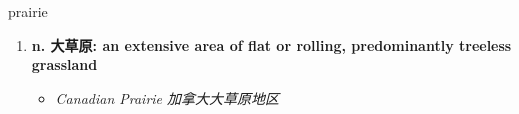 
\begin{frame}
{\huge prairie}
\begin{center}
\begin{enumerate}\Large
  \item \textbf{n. 大草原: an extensive area of flat or rolling, predominantly treeless grassland}
  \begin{itemize}
    \item \em{\Large{Canadian Prairie 加拿大大草原地区}}
  \end{itemize}
\end{enumerate}
\end{center}
\end{frame}
